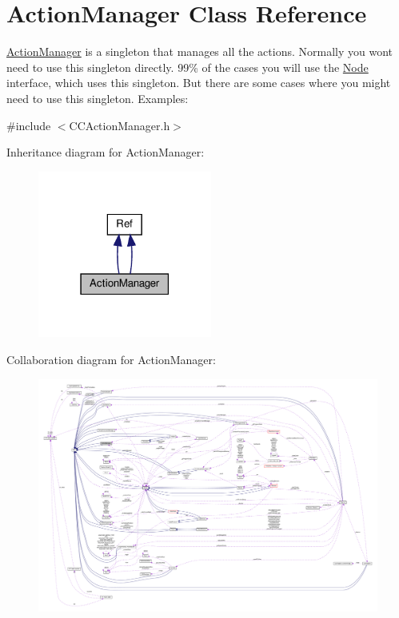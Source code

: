 \hypertarget{classActionManager}{}\section{Action\+Manager Class Reference}
\label{classActionManager}


\hyperlink{classActionManager}{Action\+Manager} is a singleton that manages all the actions. Normally you won\textquotesingle{}t need to use this singleton directly. 99\% of the cases you will use the \hyperlink{classNode}{Node} interface, which uses this singleton. But there are some cases where you might need to use this singleton. Examples\+:  




{\ttfamily \#include $<$C\+C\+Action\+Manager.\+h$>$}



Inheritance diagram for Action\+Manager\+:
\nopagebreak
\begin{figure}[H]
\begin{center}
\leavevmode
\includegraphics[width=162pt]{classActionManager__inherit__graph}
\end{center}
\end{figure}


Collaboration diagram for Action\+Manager\+:
\nopagebreak
\begin{figure}[H]
\begin{center}
\leavevmode
\includegraphics[width=350pt]{classActionManager__coll__graph}
\end{center}
\end{figure}
